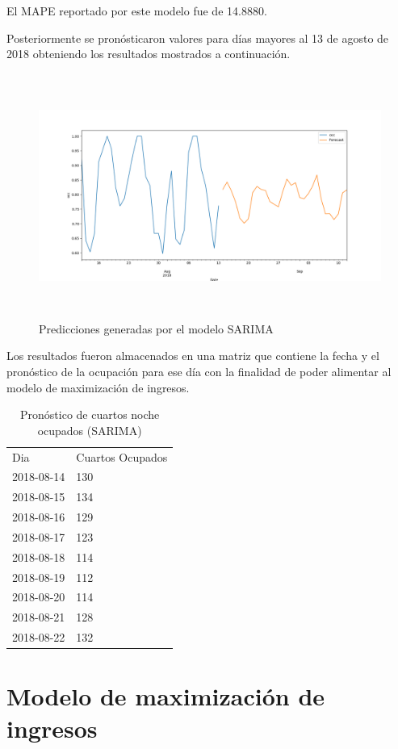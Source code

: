 El MAPE reportado por este modelo fue de 14.8880.

Posteriormente se pronósticaron valores para días mayores al 13 de agosto de 2018 obteniendo los resultados mostrados a continuación.

\begin{figure}[H]
  \centering
      \includegraphics[width=\maxwidth,height=8cm]{figures/ArimaPred.png}    
  \caption{Predicciones generadas por el modelo SARIMA}
\end{figure}

Los resultados fueron almacenados en una matriz que contiene la fecha y el pronóstico de la ocupación para ese día con la finalidad de poder alimentar al modelo de maximización de ingresos.

\begin{table}[H]
\centering
\begin{tabular}{ll}
Dia        & Cuartos Ocupados \\
2018-08-14 & 130              \\
2018-08-15 & 134              \\
2018-08-16 & 129              \\
2018-08-17 & 123              \\
2018-08-18 & 114              \\
2018-08-19 & 112              \\
2018-08-20 & 114              \\
2018-08-21 & 128              \\
2018-08-22 & 132              
\end{tabular}
\caption{Pronóstico de cuartos noche ocupados (SARIMA)} 
\end{table}


\section*{Modelo de maximización de ingresos}

